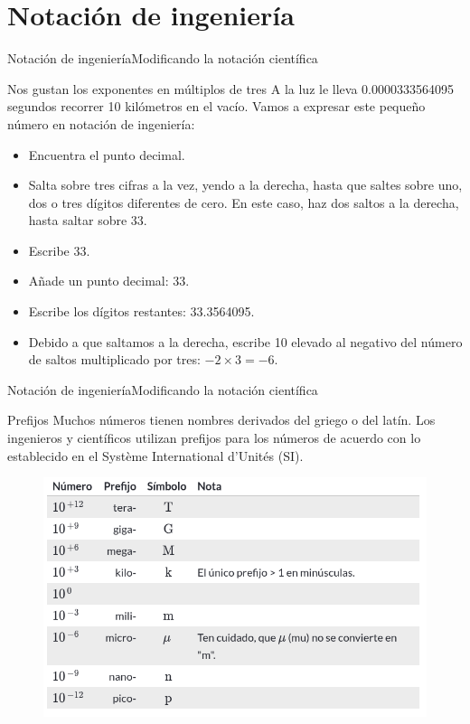 \documentclass[10pt]{beamer}
\begin{document}
\section{Notación de ingeniería}

\begin{frame}{Notación de ingeniería}{Modificando la notación científica}
\begin{block}{Nos gustan los exponentes en múltiplos de tres}
A la luz le lleva 0.0000333564095 segundos recorrer 10 kilómetros en el vacío. Vamos a expresar este pequeño número en notación de ingeniería:

\begin{itemize}
    \item Encuentra el punto decimal.
    \item Salta sobre tres cifras a la vez, yendo a la derecha, hasta que saltes sobre uno, dos o tres dígitos diferentes de cero. En este caso, haz dos saltos a la derecha, hasta saltar sobre 33.
    \item Escribe 33.
    \item Añade un punto decimal: 33.
    \item Escribe los dígitos restantes: 33.3564095.
    \item Debido a que saltamos a la derecha, escribe 10 elevado al negativo del número de saltos multiplicado por tres: $-2 \times 3 = -6$.
\end{itemize}
\end{block}
\end{frame}

\begin{frame}{Notación de ingeniería}{Modificando la notación científica}
\begin{block}{Prefijos}
Muchos números tienen nombres derivados del griego o del latín. Los ingenieros y científicos utilizan prefijos para los números de acuerdo con lo establecido en el Système International d'Unités (SI).
\end{block}

\begin{figure}[h!]
\centering
\includegraphics [scale=0.32]{prefix}
\label{fig:first}
\end{figure}

\end{frame}
\end{document}
